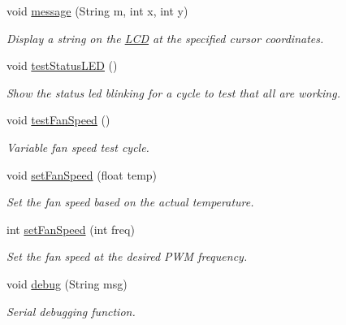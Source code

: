 \begin{DoxyCompactItemize}
void \hyperlink{_meditech___chip_kit_control_panel_8pde_ae1956b5b6310b3339e72931911b84e3f}{message} (String m, int x, int y)
\begin{DoxyCompactList}\small\item\em Display a string on the \hyperlink{class_l_c_d}{L\-C\-D} at the specified cursor coordinates. \end{DoxyCompactList}\item 
void \hyperlink{_meditech___chip_kit_control_panel_8pde_af1a6bbf84a5ea76623bdc49aaf642a28}{test\-Status\-L\-E\-D} ()
\begin{DoxyCompactList}\small\item\em Show the status led blinking for a cycle to test that all are working. \end{DoxyCompactList}\item 
void \hyperlink{_meditech___chip_kit_control_panel_8pde_a697689ffa626676db9a1abb5e6662762}{test\-Fan\-Speed} ()
\begin{DoxyCompactList}\small\item\em Variable fan speed test cycle. \end{DoxyCompactList}\item 
void \hyperlink{_meditech___chip_kit_control_panel_8pde_ac0f1975168c58bd48fc29f8e3004a5a8}{set\-Fan\-Speed} (float temp)
\begin{DoxyCompactList}\small\item\em Set the fan speed based on the actual temperature. \end{DoxyCompactList}\item 
int \hyperlink{_meditech___chip_kit_control_panel_8pde_aac6d40e9f46456f3b2d16f2fe64004cc}{set\-Fan\-Speed} (int freq)
\begin{DoxyCompactList}\small\item\em Set the fan speed at the desired P\-W\-M frequency. \end{DoxyCompactList}\item 
void \hyperlink{_meditech___chip_kit_control_panel_8pde_ad5b3677e61ca769d9d9e5cf9cfa1b33c}{debug} (String msg)
\begin{DoxyCompactList}\small\item\em Serial debugging function. \end{DoxyCompactList}\end{DoxyCompactItemize}
